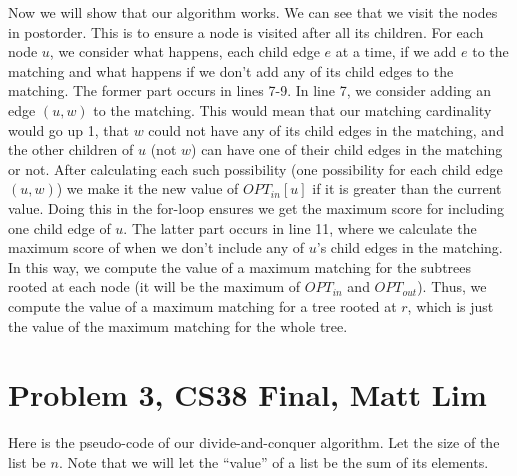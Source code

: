 \documentclass{article}
\begin{document}
Now we will show that our algorithm works. We can see that we visit the nodes in
postorder. This is to ensure a node is visited after all its children. For each
node $u$, we consider what happens, each child edge $e$ at a time, if we add
$e$ to the matching and what happens if we don't add any of its child
edges to the matching. The former part occurs in lines 7-9. In line 7, we
consider adding an edge $(u,w)$ to the matching. This would mean that our matching
cardinality would go up 1, that $w$ could not have any of its child edges in the
matching, and the other children of $u$ (not $w$) can have one of their child
edges in the matching or not. After calculating each such possibility (one
possibility for each child edge $(u,w)$) we make it the new value of
$OPT_{in}[u]$ if it is greater than the current value. Doing this in the
for-loop ensures we get the maximum score for including one child edge of $u$.
The latter part occurs in line 11, where we calculate the maximum score of when
we don't include any of $u$'s child edges in the matching. In this way, we
compute the value of a maximum matching for the subtrees rooted at each node (it
will be the maximum of $OPT_{in}$ and $OPT_{out}$).
Thus, we compute the value of a maximum matching for a tree rooted at $r$, which
is just the value of the maximum matching for the whole tree.
\newpage

\section*{Problem 3, CS38 Final, Matt Lim}
Here is the pseudo-code of our divide-and-conquer algorithm. Let the size of the
list be $n$. Note that we will let the ``value'' of a list be the sum of its elements.
\end{document}
